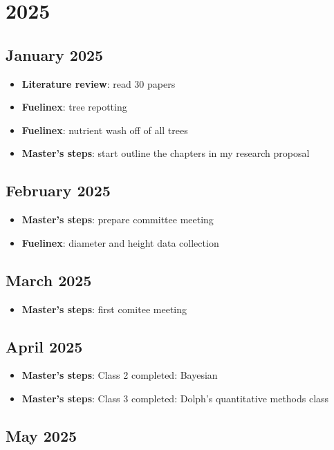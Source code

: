 \documentclass{article}
\begin{document}
\section {2025}
\subsection {January 2025}
\begin {itemize}
	\item \textbf{Literature review}: read 30 papers
	\item \textbf{Fuelinex}: tree repotting
	\item \textbf{Fuelinex}: nutrient wash off of all trees
	\item \textbf{Master's steps}: start outline the chapters in my research proposal
\end {itemize}

\subsection {February 2025}
\begin {itemize}
	\item \textbf{Master's steps}: prepare committee meeting
	\item \textbf{Fuelinex}: diameter and height data collection
\end {itemize}

\subsection {March 2025}
\begin {itemize}
	\item \textbf{Master's steps}: first comitee meeting
\end {itemize}

\subsection {April 2025}
\begin {itemize}
	\item \textbf{Master's steps}: Class 2 completed: Bayesian
	\item \textbf{Master's steps}: Class 3 completed: Dolph's quantitative methods class
\end {itemize}

\subsection {May 2025}
\begin {itemize}

\end {itemize}
\end{document}
